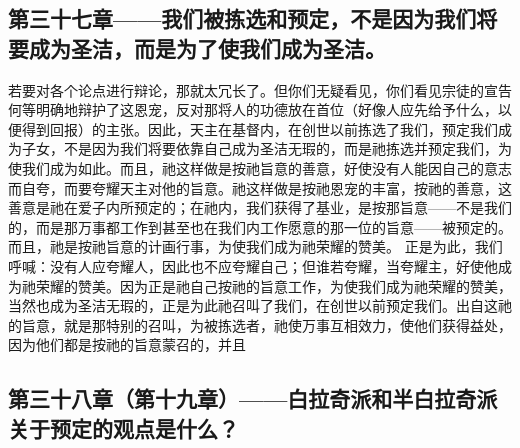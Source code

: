 
\subsection{第三十七章——我们被拣选和预定，不是因为我们将要成为圣洁，而是为了使我们成为圣洁。}

若要对各个论点进行辩论，那就太冗长了。但你们无疑看见，你们看见宗徒的宣告何等明确地辩护了这恩宠，反对那将人的功德放在首位（好像人应先给予什么，以便得到回报）的主张。因此，天主在基督内，在创世以前拣选了我们，预定我们成为子女，不是因为我们将要依靠自己成为圣洁无瑕的，而是祂拣选并预定我们，为使我们成为如此。而且，祂这样做是按祂旨意的善意，好使没有人能因自己的意志而自夸，而要夸耀天主对他的旨意。祂这样做是按祂恩宠的丰富，按祂的善意，这善意是祂在爱子内所预定的；在祂内，我们获得了基业，是按那旨意——不是我们的，而是那万事都工作到甚至也在我们内工作愿意的那一位的旨意——被预定的。而且，祂是按祂旨意的计画行事，为使我们成为祂荣耀的赞美。 正是为此，我们呼喊：没有人应夸耀人，因此也不应夸耀自己；但谁若夸耀，当夸耀主，好使他成为祂荣耀的赞美。因为正是祂自己按祂的旨意工作，为使我们成为祂荣耀的赞美，当然也成为圣洁无瑕的，正是为此祂召叫了我们，在创世以前预定我们。出自这祂的旨意，就是那特别的召叫，为被拣选者，祂使万事互相效力，使他们获得益处，因为他们都是按祂的旨意蒙召的，并且\par


\subsection{第三十八章（第十九章）——白拉奇派和半白拉奇派关于预定的观点是什么？}

